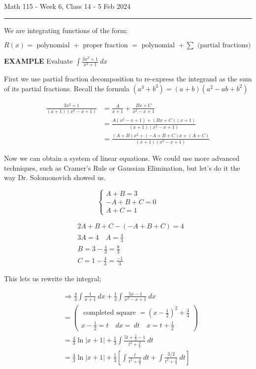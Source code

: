 \documentclass{article}
\begin{document}
Math 115 - Week 6, Class 14 - 5 Feb 2024
\hrule

\vspace{10pt}

We are integrating functions of the form:

$R(x)=\mbox{ polynomial }+\mbox{ proper fraction }=\mbox{ polynomial }+\sum\mbox{ (partial fractions) }$

\vspace{10pt}

{\bf{}EXAMPLE} Evaluate $\displaystyle\int\frac{3x^2+1}{x^3+1}\ dx$

\vspace{10pt}

First we use partial fraction decomposition to re-express the integrand as the sum of its partial fractions. Recall the formula $(a^3+b^3)=(a+b)(a^2-ab+b^2)$

\begin{align*}
\frac{3x^2+1}{(x+1)(x^2-x+1)}&=\frac{A}{x+1}+\frac{Bx+C}{x^2-x+1}\\
&=\frac{A(x^2-x+1)+(Bx+C)(x+1)}{(x+1)(x^2-x+1)}\\
&=\frac{(A+B)x^2+(-A+B+C)x+(A+C)}{(x+1)(x^2-x+1)}
\end{align*}

Now we can obtain a system of linear equations. We could use more advanced techniques, such as Cramer's Rule or Gaussian Elimination, but let's do it the way Dr. Solomonovich showed us.

\[\left\{\begin{aligned}A+B=3\\-A+B+C=0\\A+C=1\end{aligned}\right.\]

\begin{align*}
&2A+B+C-(-A+B+C)=4\\
&3A=4\quad\boxed{A=\frac{4}{3}}\\
&B=3-\frac{4}{3}=\frac{8}{3}\\
&C=1-\frac{4}{3}=\frac{-1}{3}
\end{align*}

This lets us rewrite the integral;

\begin{align*}
&\Rightarrow\frac{4}{3}\int\frac{1}{x+1}\ dx+\frac{1}{3}\int\frac{5x-1}{x^2-x+1}\ dx\\
&=\left(\begin{aligned}\mbox{ completed square }=\left(x-\frac{1}{2}\right)^2+\frac{3}{4}\\x-\frac{1}{2}=t\quad dx=\ dt\quad x=t+\frac{1}{2}\end{aligned}\right)\\
&=\frac{4}{3}\ln|x+1|+\frac{1}{3}\int\frac{5t+\frac{5}{2}-1}{t^2+\frac{3}{4}}\ dt\\
&=\frac{4}{3}\ln|x+1|+\frac{1}{3}\left[\int\frac{t}{t^2+\frac{3}{4}}\ dt+\int\frac{3/2}{t^2+\frac{3}{4}}\ dt\right]
\end{align*}
\end{document}
